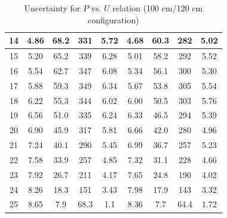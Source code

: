 \documentclass[12pt]{article}
\begin{document}
\begin{table}[H]
\begin{tabular}{|c|c|c|c|c|c|c|c|c|}
14 & 4.86        & 68.2   &331 &5.72     & 4.68        & 60.3     &282  &5.02    \\ \hline
15 & 5.20        & 65.2   &339 &6.28     & 5.01        & 58.2     &292  &5.52    \\ \hline
16 & 5.54        & 62.7   &347 &6.08     & 5.34        & 56.1     &300  &5.30    \\ \hline
17 & 5.88  		 &59.3    &349 &6.34     & 5.67        &53.8      &305  &5.54    \\ \hline
18 & 6.22        & 55.3   &344 &6.02     & 6.00        & 50.5     &303  &5.76    \\ \hline
19 & 6.56        & 51.0   &335 &6.24     & 6.33        & 46.5     &294  &5.39    \\ \hline
20 & 6.90        & 45.9   &317 &5.81     & 6.66        & 42.0     &280  &4.96    \\ \hline
21 & 7.24        & 40.1   &290 &5.45     & 6.99        & 36.7     &257  &5.23    \\ \hline
22 & 7.58        & 33.9   &257 &4.85     & 7.32        & 31.1     &228  &4.66    \\ \hline
23 & 7.92        & 26.7   &211 &4.17     & 7.65        & 24.8     &190  &4.02    \\ \hline
24 & 8.26        & 18.3   &151 &3.43     & 7.98        & 17.9     &143  &3.32    \\ \hline
25 & 8.65        & 7.9    &68.3&1.1      & 8.36        & 7.7      &64.4 &1.72    \\ \hline
\end{tabular}
\caption{Uncertainty for $P$ vs. $U$ relation (100 cm/120 cm configuration)}
\end{table}
\end{document}
